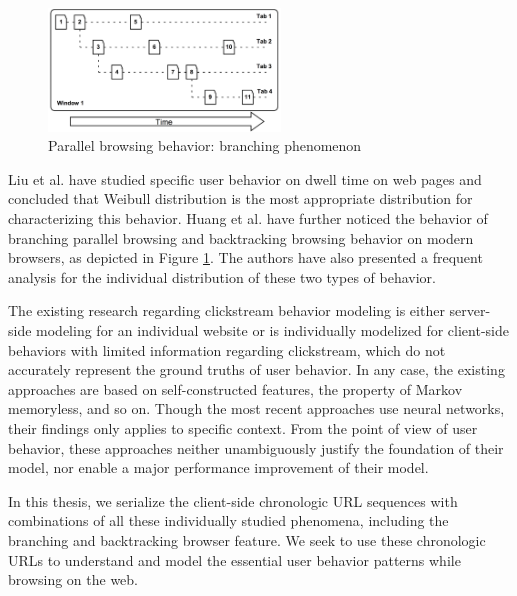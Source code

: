 
\begin{figure}[H]
    \centering
    \includegraphics[width=0.55\textwidth]{figures/branching-and-backtracking}
    \caption{Parallel browsing behavior: branching phenomenon \cite{huang2010parallel}}
    \label{fig:backtrace}
\end{figure}

Liu et al. \cite{liu2010understanding} have studied specific user behavior on dwell time on web pages
and concluded that Weibull distribution is the most appropriate distribution for characterizing 
this behavior. 
Huang et al. \cite{huang2010parallel, huang2012no} have further 
noticed the behavior of branching parallel browsing and backtracking browsing
behavior on modern browsers, as depicted in Figure \ref{fig:backtrace}.
The authors have also presented a frequent analysis for the individual distribution of 
these two types of behavior.

The existing research regarding clickstream 
behavior modeling is either server-side modeling for an individual website or 
is individually modelized for client-side behaviors with limited information regarding clickstream,
which do not accurately represent the ground truths of user behavior. 
In any case, the existing approaches are based on self-constructed features, 
the property of Markov memoryless, and so on. Though the most recent
approaches use neural networks, their findings only applies to specific context.
From the point of view of user behavior, these approaches 
neither unambiguously justify the foundation of their model, 
nor enable a major performance improvement of their model.

In this thesis, we serialize the client-side chronologic URL sequences with combinations of all 
these individually studied phenomena, including the branching and backtracking browser 
feature. We seek to use these chronologic URLs to understand and model the essential user 
behavior patterns while browsing on the web.


